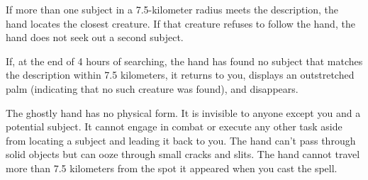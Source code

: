 {	If more than one subject in a 7.5-kilometer radius meets the description, the hand locates the closest creature. If that creature refuses to follow the hand, the hand does not seek out a second subject.

	If, at the end of 4 hours of searching, the hand has found no subject that matches the description within 7.5 kilometers, it returns to you, displays an outstretched palm (indicating that no such creature was found), and disappears.

	The ghostly hand has no physical form. It is invisible to anyone except you and a potential subject. It cannot engage in combat or execute any other task aside from locating a subject and leading it back to you. The hand can't pass through solid objects but can ooze through small cracks and slits. The hand cannot travel more than 7.5 kilometers from the spot it appeared when you cast the spell.

}
